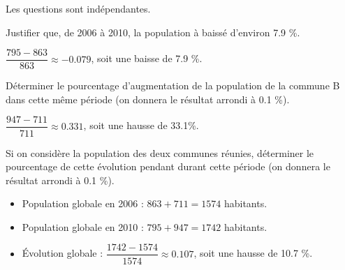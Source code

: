 Les questions sont indépendantes.

\begin{questions}
	\question Justifier que, de 2006 à 2010, la population à baissé d'environ \num{7.9} \%.
	\begin{solution}
		$\dfrac{795 - 863}{863} \approx \num{-0.079} $, soit une baisse de \num{7.9} \%.
	\end{solution}
	
	\question Déterminer le pourcentage d'augmentation de la population de la commune B dans cette même période (on donnera le résultat arrondi à \num{0.1} \%).
	\begin{solution}
		$\dfrac{947-711}{711}\approx \num{0.331}$, soit une hausse de \num{33.1}\%.
	\end{solution}
	
	\question Si on considère la population des deux communes réunies, déterminer le pourcentage de cette évolution pendant durant cette période (on donnera le résultat arrondi à \num{0.1} \%).
	\begin{solution}
		\begin{itemize}
			\item Population globale en 2006 : $863 + 711 = 1574$ habitants.
			\item Population globale en 2010 : $795 + 947 = 1742$ habitants.
			\item \'Evolution globale : $\dfrac{1742-1574}{1574} \approx \num{0.107}$, soit une hausse de \num{10.7} \%.
		\end{itemize}
	\end{solution}
	
\end{questions}